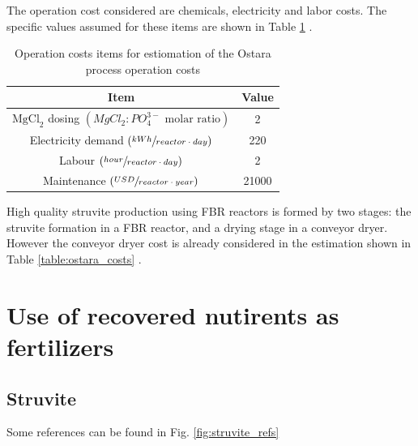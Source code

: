 \documentclass[10pt,a4paper]{article}
\begin{document}
The operation cost considered are chemicals, electricity and labor costs. The specific values assumed for these items are shown in Table \ref{table:ostara_op_costs} \cite{Pearl2Kcost2}.

\begin{table}[H] 
	\begin{adjustwidth}{}{}
		\centering
		\caption{Operation costs items for estiomation of the Ostara process operation costs} \label{table:ostara_op_costs}
		\begin{tabular}{c c}
			\toprule
			Item & Value \\ \midrule
			$\text{MgCl}_{2}$ dosing $\left(MgCl_{2}:PO_{4}^{3-} \text{ molar ratio} \right)$ & 2 \\
			Electricity demand $\left( \sfrac{kWh}{reactor \cdot day} \right)$	& 220 \\
			Labour $\left( \sfrac{hour}{reactor \cdot day} \right)$	& 2   \\ 
			Maintenance $\left( \sfrac{USD}{reactor \cdot year} \right)$	& 21000   \\
			\bottomrule 
		\end{tabular}
	\end{adjustwidth}
\end{table}

High quality struvite production using FBR reactors is formed by two stages: the struvite formation in a FBR reactor, and a drying stage in a conveyor dryer. However the conveyor dryer cost is already considered in the estimation shown in Table \ref{table:ostara_costs} \cite{Pearl2Kcost2}.


\section{Use of recovered nutirents as fertilizers}
\subsection{Struvite}
Some references can be found in Fig. \ref{fig:struvite_refs}
\end{document}
